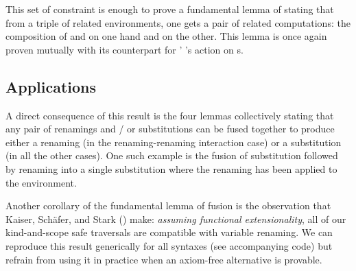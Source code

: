 This set of constraint is enough to prove a fundamental lemma of  stating
that from a triple of related environments, one gets a pair of related computations:
the composition of  and  on one hand and  on the other. This
lemma is once again proven mutually with its counterpart for ' 's
action on s.



\subsection{Applications}

A direct consequence of this result is the four lemmas collectively stating
that any pair of renamings and / or substitutions can be fused together to
produce either a renaming (in the renaming-renaming interaction case) or a
substitution (in all the other cases). One such example is the fusion of
substitution followed by renaming into a single substitution where the
renaming has been applied to the environment.


Another corollary of the fundamental lemma of fusion is the observation that
Kaiser, Schäfer, and Stark (\citeyear{Kaiser-wsdebr}) make: \emph{assuming
  functional extensionality}, all of our kind-and-scope safe traversals are
compatible with variable renaming. We can reproduce this result generically
for all syntaxes (see accompanying code) but refrain from using it in practice
when an axiom-free alternative is provable.
